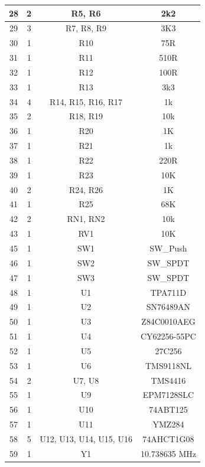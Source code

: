 \begin{longtable}{ |*{4}{c|} }
\hline
{28} & {2} & {R5, R6} & {2k2} \\
\hline
{29} & {3} & {R7, R8, R9} & {3K3} \\
\hline
{30} & {1} & {R10} & {75R} \\
\hline
{31} & {1} & {R11} & {510R} \\
\hline
{32} & {1} & {R12} & {100R} \\
\hline
{33} & {1} & {R13} & {3k3} \\
\hline
{34} & {4} & {R14, R15, R16, R17} & {1k} \\
\hline
{35} & {2} & {R18, R19} & {10k} \\
\hline
{36} & {1} & {R20} & {1K} \\
\hline
{37} & {1} & {R21} & {1k} \\
\hline
{38} & {1} & {R22} & {220R} \\
\hline
{39} & {1} & {R23} & {10K} \\
\hline
{40} & {2} & {R24, R26} & {1K} \\
\hline
{41} & {1} & {R25} & {68K} \\
\hline
{42} & {2} & {RN1, RN2} & {10k} \\
\hline
{43} & {1} & {RV1} & {10K} \\
\hline
{45} & {1} & {SW1} & {SW\_Push} \\
\hline
{46} & {1} & {SW2} & {SW\_SPDT} \\
\hline
{47} & {1} & {SW3} & {SW\_SPDT} \\
\hline
{48} & {1} & {U1} & {TPA711D} \\
\hline
{49} & {1} & {U2} & {SN76489AN} \\
\hline
{50} & {1} & {U3} & {Z84C0010AEG} \\
\hline
{51} & {1} & {U4} & {CY62256-55PC} \\
\hline
{52} & {1} & {U5} & {27C256} \\
\hline
{53} & {1} & {U6} & {TMS9118NL} \\
\hline
{54} & {2} & {U7, U8} & {TMS4416} \\
\hline
{55} & {1} & {U9} & {EPM7128SLC} \\
\hline
{56} & {1} & {U10} & {74ABT125} \\
\hline
{57} & {1} & {U11} & {YMZ284} \\
\hline
{58} & {5} & {U12, U13, U14, U15, U16} & {74AHCT1G08} \\
\hline
{59} & {1} & {Y1} & {10.738635 MHz} \\
\hline
\end{longtable}

